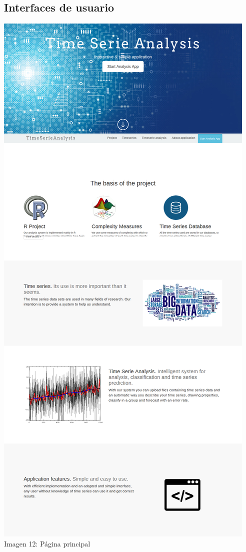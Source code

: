 \documentclass[14pt]{extarticle}
\theoremstyle{definition}
\theoremstyle{remark}
\begin{document}
\subsection{Interfaces de usuario}\label{sec:interfacesdeusuario}
\begin{center}
\includegraphics[scale=0.2]{HomePage.png}
\\Imagen 12: Página principal
\end{center}
\end{document}

